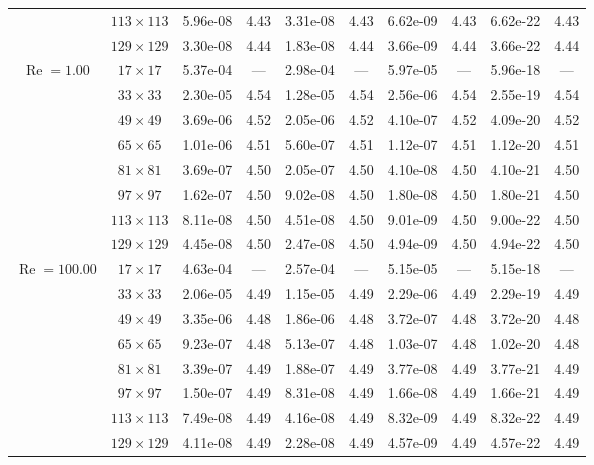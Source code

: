 \documentclass[preprint, 12pt]{elsarticle}
\begin{document}
\begin{center}
\begin{table}[H]
{\begin{tabular*}{\textwidth}{@{\extracolsep\fill}cccccccccc@{}}
    & $113\times 113$ & 5.96e-08 & 4.43 & 3.31e-08 & 4.43 & 6.62e-09 & 4.43 & 6.62e-22 & 4.43 \\
    & $129\times 129$ & 3.30e-08 & 4.44 & 1.83e-08 & 4.44 & 3.66e-09 & 4.44 & 3.66e-22 & 4.44 \\
    \hline\hline
    \multirow{7}{*}{$\operatorname{Re}=1.00$} & $17\times 17$ & 5.37e-04 & --- & 2.98e-04 & --- & 5.97e-05 & --- & 5.96e-18 & --- \\
    & $33\times 33$ & 2.30e-05 & 4.54 & 1.28e-05 & 4.54 & 2.56e-06 & 4.54 & 2.55e-19 & 4.54 \\
    & $49\times 49$ & 3.69e-06 & 4.52 & 2.05e-06 & 4.52 & 4.10e-07 & 4.52 & 4.09e-20 & 4.52 \\
    \multirow{3}{*}{$\operatorname{Wi}=10$} & $65\times 65$ & 1.01e-06 & 4.51 & 5.60e-07 & 4.51 & 1.12e-07 & 4.51 & 1.12e-20 & 4.51 \\
    & $81\times 81$ & 3.69e-07 & 4.50 & 2.05e-07 & 4.50 & 4.10e-08 & 4.50 & 4.10e-21 & 4.50 \\
    & $97\times 97$ & 1.62e-07 & 4.50 & 9.02e-08 & 4.50 & 1.80e-08 & 4.50 & 1.80e-21 & 4.50 \\
    & $113\times 113$ & 8.11e-08 & 4.50 & 4.51e-08 & 4.50 & 9.01e-09 & 4.50 & 9.00e-22 & 4.50 \\
    & $129\times 129$ & 4.45e-08 & 4.50 & 2.47e-08 & 4.50 & 4.94e-09 & 4.50 & 4.94e-22 & 4.50 \\
    \hline
    \multirow{7}{*}{$\operatorname{Re}=100.00$} & $17\times 17$ & 4.63e-04 & --- & 2.57e-04 & --- & 5.15e-05 & --- & 5.15e-18 & --- \\
    & $33\times 33$ & 2.06e-05 & 4.49 & 1.15e-05 & 4.49 & 2.29e-06 & 4.49 & 2.29e-19 & 4.49 \\
    & $49\times 49$ & 3.35e-06 & 4.48 & 1.86e-06 & 4.48 & 3.72e-07 & 4.48 & 3.72e-20 & 4.48 \\
    \multirow{3}{*}{$\operatorname{Wi}=10$} & $65\times 65$ & 9.23e-07 & 4.48 & 5.13e-07 & 4.48 & 1.03e-07 & 4.48 & 1.02e-20 & 4.48 \\
    & $81\times 81$ & 3.39e-07 & 4.49 & 1.88e-07 & 4.49 & 3.77e-08 & 4.49 & 3.77e-21 & 4.49 \\
    & $97\times 97$ & 1.50e-07 & 4.49 & 8.31e-08 & 4.49 & 1.66e-08 & 4.49 & 1.66e-21 & 4.49 \\
    & $113\times 113$ & 7.49e-08 & 4.49 & 4.16e-08 & 4.49 & 8.32e-09 & 4.49 & 8.32e-22 & 4.49 \\
    & $129\times 129$ & 4.11e-08 & 4.49 & 2.28e-08 & 4.49 & 4.57e-09 & 4.49 & 4.57e-22 & 4.49 \\

\end{tabular*}}
\end{table}
\end{center}
\end{document}

